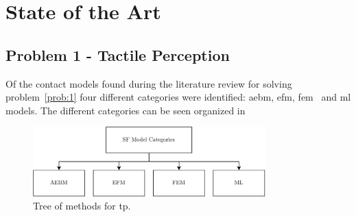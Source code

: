 \chapter{State of the Art}\label{ch:state-of-the-art}

\section{Problem 1 - Tactile Perception}\label{sec:lit-rev-problem-1}

Of the contact models found during the literature review for solving problem~\ref{prob:1}
four different categories were identified: \gls{aebm}, \gls{efm}, \gls{fem}~\cite{a-modified-elastic-foundation-contact-model-for-application-in-3d-models-of-the-prosthetic-knee} and \gls{ml} models. The different categories can be seen organized in  \medskip
%
\begin{figure}[h]
	\begin{small}
		\begin{center}
			\includegraphics[width=0.8\textwidth]{chapters/state-of-the-art/fig/sf-categories.pdf}
		\end{center}
		\caption{Tree of methods for \gls{tp}.}
		\label{fig:sf-categories}
	\end{small}
\end{figure}

